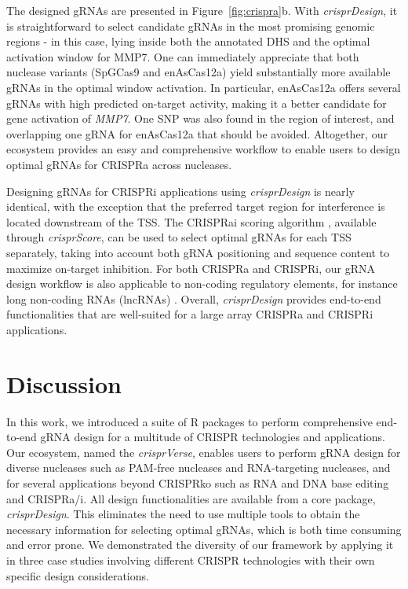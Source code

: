 \documentclass[pdftex,english,10pt]{article}
\begin{document}
The designed gRNAs are presented in Figure~\ref{fig:crispra}b. 
With \textit{crisprDesign}, it is straightforward to select candidate gRNAs in the most promising genomic regions - in this case, lying inside both the annotated DHS and the optimal activation window for MMP7. One can immediately appreciate that both nuclease variants (SpGCas9 and enAsCas12a) yield substantially more available gRNAs in the optimal window activation. In particular, enAsCas12a offers several gRNAs with high predicted on-target activity, making it a better candidate for gene activation of \textit{MMP7}. One SNP was also found in the region of interest, and overlapping one gRNA for enAsCas12a that should be avoided. Altogether, our ecosystem provides an easy and comprehensive workflow to enable users to design optimal gRNAs for CRISPRa across nucleases. 




Designing gRNAs for CRISPRi applications using \textit{crisprDesign} is nearly identical, with the exception that the preferred target region for interference is located downstream of the TSS. The CRISPRai scoring algorithm \citep{crispria}, available through \textit{crisprScore}, can be used to select optimal gRNAs for each TSS separately, taking into account both gRNA positioning and sequence content to maximize on-target inhibition. For both CRISPRa and CRISPRi, our gRNA design workflow is also applicable to non-coding regulatory elements, for instance long non-coding RNAs (lncRNAs) \citep{liu2017crispri}. Overall, \textit{crisprDesign} provides end-to-end functionalities that are well-suited for a large array CRISPRa and CRISPRi applications.




\section*{Discussion}


In this work, we introduced a suite of R packages to perform comprehensive end-to-end gRNA design for a multitude of CRISPR technologies and applications. Our ecosystem, named the \textit{crisprVerse},  enables users to perform gRNA design for diverse nucleases such as PAM-free nucleases and RNA-targeting nucleases, and for several applications beyond CRISPRko such as RNA and DNA base editing and CRISPRa/i. All design functionalities are available from a core package, \textit{crisprDesign}. This eliminates the need to use multiple tools to obtain the necessary information for selecting optimal gRNAs, which is both time consuming and error prone. We demonstrated the diversity of our framework by applying it in three case studies involving different CRISPR technologies with their own specific design considerations. 
\end{document}
